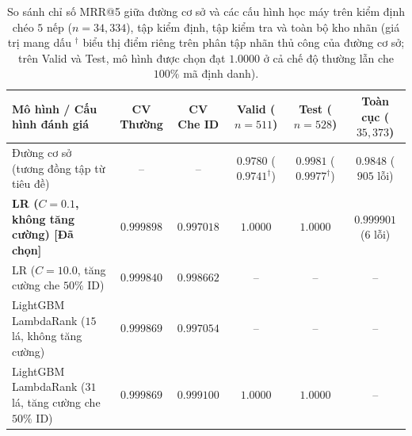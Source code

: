 \begin{table}[htbp]
    \centering
    \scriptsize
    \renewcommand{\arraystretch}{1.18}
    \begin{tabularx}{\textwidth}{X c c c c c}
        \toprule
        \textbf{Mô hình / Cấu hình đánh giá} & \textbf{CV Thường} & \textbf{CV Che ID} & \textbf{Valid ($n=511$)} & \textbf{Test ($n=528$)} & \textbf{Toàn cục ($35{,}373$)} \\
        \midrule
        Đường cơ sở (tương đồng tập từ tiêu đề) & -- & -- & $0.9780$ ($0.9741^\dagger$) & $0.9981$ ($0.9977^\dagger$) & $0.9848$ ($905$ lỗi) \\
        \midrule
        \textbf{LR ($C=0.1$, không tăng cường) [Đã chọn]} & $\mathbf{0.999898}$ & $0.997018$ & $\mathbf{1.0000}$ & $\mathbf{1.0000}$ & $\mathbf{0.999901}$ ($6$ lỗi) \\
        LR ($C=10.0$, tăng cường che $50\%$ ID) & $0.999840$ & $0.998662$ & -- & -- & -- \\
        LightGBM LambdaRank ($15$ lá, không tăng cường) & $0.999869$ & $0.997054$ & -- & -- & -- \\
        LightGBM LambdaRank ($31$ lá, tăng cường che $50\%$ ID) & $0.999869$ & $\mathbf{0.999100}$ & $\mathbf{1.0000}$ & $\mathbf{1.0000}$ & -- \\
        \bottomrule
    \end{tabularx}
    \caption[So sánh chỉ số MRR@5 giữa đường cơ sở và các cấu hình học máy]{So sánh chỉ số MRR@5 giữa đường cơ sở và các cấu hình học máy trên kiểm định chéo $5$ nếp ($n=34{,}334$), tập kiểm định, tập kiểm tra và toàn bộ kho nhãn (giá trị mang dấu $^\dagger$ biểu thị điểm riêng trên phân tập nhãn thủ công của đường cơ sở; trên Valid và Test, mô hình được chọn đạt $1.0000$ ở cả chế độ thường lẫn che $100\%$ mã định danh).}
    \label{tab:m3_results}
\end{table}

